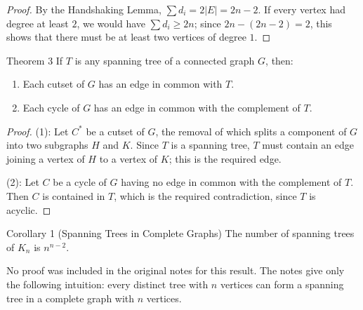 \begin{proof}
By the Handshaking Lemma, $\sum d_i = 2|E| = 2n - 2$. If every vertex had degree at least $2$, we would have $\sum d_i \geq 2n$; since $2n - (2n-2) = 2$, this shows that there must be at least two vertices of degree $1$.
\end{proof}

\begin{thmbox}{Theorem 3}
If $T$ is any spanning tree of a connected graph $G$, then:
\begin{enumerate}
  \item Each cutset of $G$ has an edge in common with $T$.
  \item Each cycle of $G$ has an edge in common with the complement of $T$.
\end{enumerate}
\end{thmbox}

\begin{proof}
(1): Let $C^*$ be a cutset of $G$, the removal of which splits a component of $G$ into two subgraphs $H$ and $K$. Since $T$ is a spanning tree, $T$ must contain an edge joining a vertex of $H$ to a vertex of $K$; this is the required edge.

\smallskip
\noindent (2): Let $C$ be a cycle of $G$ having no edge in common with the complement of $T$. Then $C$ is contained in $T$, which is the required contradiction, since $T$ is acyclic.
\end{proof}

\begin{thmbox}{Corollary 1 (Spanning Trees in Complete Graphs)}
The number of spanning trees of $K_n$ is $n^{n-2}$.
\end{thmbox}

\begin{remark}
No proof was included in the original notes for this result. The notes give only the following intuition: every distinct tree with $n$ vertices can form a spanning tree in a complete graph with $n$ vertices.
\end{remark}

